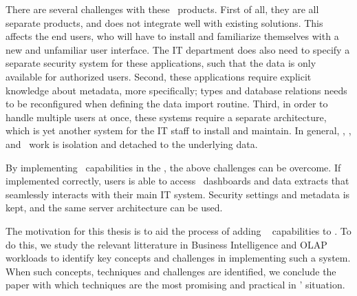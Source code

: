 There are several challenges with these \bd~products. First of all, they are all separate products, and does not integrate well with existing solutions. This affects the end users, who will have to install and familiarize themselves with a new and unfamiliar user interface. The IT department does also need to specify a separate security system for these applications, such that the data is only available for authorized users. Second, these applications require explicit knowledge about metadata, more specifically; types and database relations needs to be reconfigured when defining the data import routine. Third, in order to handle multiple users at once, these systems require a separate architecture, which is yet another system for the IT staff to install and maintain. In general, \qlikview, \tableau, and \powerpivot~work is isolation and detached to the underlying data.

By implementing \bi~capabilities in the \genusSoftware, the above challenges can be overcome. If implemented correctly, users is able to access \bi~dashboards and data extracts that seamlessly interacts with their main IT system. Security settings and metadata is kept, and the same server architecture can be used.

The motivation for this thesis is to aid the process of adding \bi~ capabilities to \genusSoftware. To do this, we study the relevant litterature in Business Intelligence and OLAP workloads to identify key concepts and challenges in implementing such a system. When such concepts, techniques and challenges are identified, we conclude the paper with which techniques are the most promising and practical in \genus' situation.
